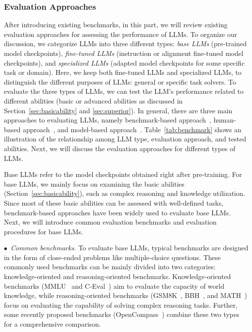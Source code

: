 \subsubsection{Evaluation Approaches}\label{subsec-evaapp}
After introducing existing benchmarks, in this part, we will review existing evaluation approaches for assessing the performance of LLMs.
To organize our discussion, we categorize LLMs into three different types: \emph{base LLMs} (pre-trained model checkpoints), \emph{fine-tuned LLMs} (instruction or alignment fine-tuned model checkpoints), and \emph{specialized LLMs} (adapted model checkpoints for some specific task or domain).
Here, we keep both fine-tuned LLMs and specialized LLMs, to distinguish the different purposes of LLMs: general or specific  task solvers.
To evaluate the three types of LLMs, we can test the LLM's performance related to  different abilities (\eg basic or advanced abilities as discussed in Section~\ref{sec:basicability} and \ref{sec:superior}).
In general, there are three main approaches to evaluating LLMs, namely benchmark-based approach~\cite{Hendrycks-ICLR-2021-Measuring}, human-based approach~\cite{Zheng-2023-arxiv-Judging}, and model-based approach~\cite{Li-2023-github-alpaca_eval}.
Table~\ref{tab:benchmark} shows an illustration of the relationship among LLM type, evaluation approach, and tested abilities. 
Next, we will discuss the evaluation approaches for different types of LLMs.

Base LLMs refer to the model checkpoints obtained right after pre-training.
For base LLMs, we mainly focus on examining the basic abilities (Section~\ref{sec:basicability}), such as complex reasoning and knowledge utilization.
Since most of these basic abilities can be assessed with well-defined tasks, benchmark-based approaches have been widely used to evaluate base LLMs.
Next, we will introduce common evaluation benchmarks and evaluation procedures for base LLMs.

$\bullet$~\emph{Common benchmarks.}
To evaluate base LLMs, typical benchmarks are designed in the form of close-ended problems like multiple-choice questions.
These commonly used benchmarks can be mainly divided into two categories: knowledge-oriented and reasoning-oriented benchmarks.
Knowledge-oriented benchmarks (\eg MMLU~\cite{Hendrycks-ICLR-2021-Measuring} and C-Eval~\cite{Huang-arxiv-2023-CEval}) aim to evaluate the capacity of world knowledge, while reasoning-oriented benchmarks (\eg GSM8K~\cite{Gao-arxiv-2023-Human}, BBH~\cite{Suzgun-arxiv-2022-Challenging}, and MATH~\cite{Hendrycks-ICLR-2021-Measuring}) focus on evaluating the capability of solving complex reasoning tasks.
Further, some recently proposed benchmarks (\eg OpenCompass~\cite{2023opencompass}) combine these two types for a comprehensive comparison.

